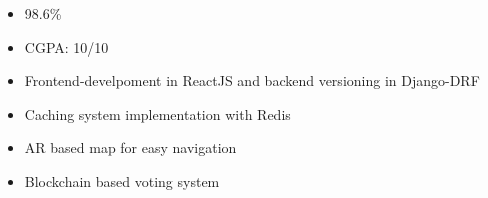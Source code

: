 
\begin{itemize}
    \item 98.6\%
\end{itemize}

\divider

\begin{itemize}
    \item CGPA: 10/10
\end{itemize}








\begin{itemize}
\item Frontend-develpoment in ReactJS and backend versioning in Django-DRF
\end{itemize}
\smallskip
{}
\begin{itemize}
\item Caching system implementation with Redis
\end{itemize}
\smallskip
{}
\begin{itemize}
\item AR based map for easy navigation \end{itemize}
\smallskip
{}
\begin{itemize}
\item Blockchain based voting system \end{itemize}
\smallskip

